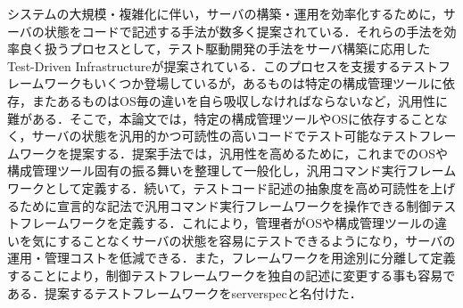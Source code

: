 \begin{eabstract}
システムの大規模・複雑化に伴い，サーバの構築・運用を効率化するために，サーバの状態をコードで記述する手法が数多く提案されている．それらの手法を効率良く扱うプロセスとして，テスト駆動開発の手法をサーバ構築に応用したTest-Driven Infrastructureが提案されている．このプロセスを支援するテストフレームワークもいくつか登場しているが，あるものは特定の構成管理ツールに依存，またあるものはOS毎の違いを自ら吸収しなければならないなど，汎用性に難がある．そこで，本論文では，特定の構成管理ツールやOSに依存することなく，サーバの状態を汎用的かつ可読性の高いコードでテスト可能なテストフレームワークを提案する．提案手法では，汎用性を高めるために，これまでのOSや構成管理ツール固有の振る舞いを整理して一般化し，汎用コマンド実行フレームワークとして定義する．続いて，テストコード記述の抽象度を高め可読性を上げるために宣言的な記法で汎用コマンド実行フレームワークを操作できる制御テストフレームワークを定義する．これにより，管理者がOSや構成管理ツールの違いを気にすることなくサーバの状態を容易にテストできるようになり，サーバの運用・管理コストを低減できる．また，フレームワークを用途別に分離して定義することにより，制御テストフレームワークを独自の記述に変更する事も容易である．提案するテストフレームワークをserverspecと名付けた．
\end{eabstract}
